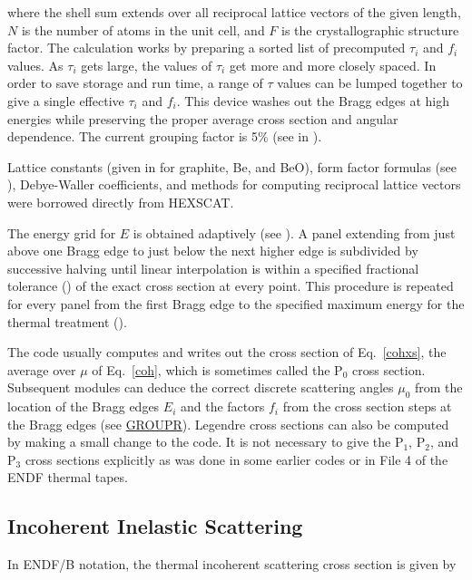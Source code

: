 \noindent
where the shell sum extends over all reciprocal lattice vectors
of the given length, $N$ is the number of atoms in the unit cell,
and  $F$ is the crystallographic structure factor.  The calculation
works by preparing a sorted list of precomputed $\tau_i$ and $f_i$
values.  As $\tau_i$ gets large, the values of $\tau_i$ get more and more
closely spaced.  In order to save storage and run time, a range of $\tau$
values can be lumped together to give a single effective $\tau_i$ and
$f_i$.  This device washes out the Bragg edges at high energies while
preserving the proper average cross section and angular dependence.
The current grouping factor is 5\% (see  in ).

Lattice constants (given in  for graphite, Be, and BeO), form
factor formulas (see ), Debye-Waller coefficients, and methods
for computing reciprocal lattice vectors were borrowed directly
 from HEXSCAT.

The energy grid for $E$ is obtained adaptively (see ).  A panel
extending from just above one Bragg edge to just below the next
higher edge is subdivided by successive halving until linear
interpolation is within a specified fractional tolerance () of the
exact cross section at every point.  This procedure is repeated for
every panel from the first Bragg edge to the specified maximum
energy for the thermal treatment ().

The code usually computes and writes out the cross section of
Eq.~\ref{cohxs}, the average over $\mu$ of Eq.~\ref{coh},
which is sometimes called the P$_0$ cross section.  Subsequent modules can
deduce the correct discrete scattering angles $\mu_0$ from the
location of the Bragg edges $E_i$ and the factors $f_i$ from the
cross section steps at the Bragg edges (see
\hyperlink{sGROUPRhy}{GROUPR}).
Legendre cross sections can also be computed by making a small change
to the code.  It is not necessary to give the P$_1$, P$_2$, and P$_3$ cross
sections explicitly as was done in some earlier codes or in File 4
of the ENDF thermal tapes.

\subsection{Incoherent Inelastic Scattering}
\label{ssTHERMR_incoh_inel}

In ENDF/B notation, the thermal incoherent scattering cross section
 is given by

